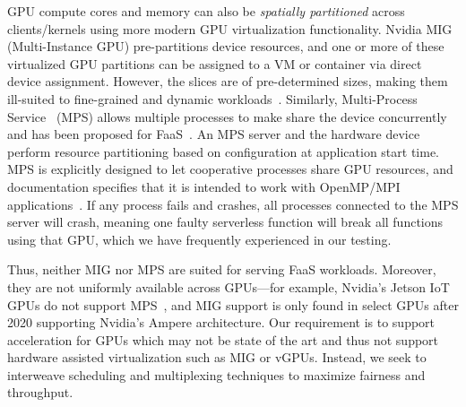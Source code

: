 GPU compute cores and memory can also be \emph{spatially partitioned} across clients/kernels using more modern GPU virtualization functionality. 
Nvidia MIG~\cite{nvidia-mig} (Multi-Instance GPU) pre-partitions device resources, and one or more of these virtualized GPU partitions can be assigned to a VM or container via direct device assignment.
However, the slices are of pre-determined sizes, making them ill-suited to fine-grained and dynamic workloads~\cite{li2022miso}. 
Similarly, Multi-Process Service~\cite{nvidia-mps} (MPS) allows multiple processes to make share the device concurrently and has been proposed for FaaS~\cite{gu2023fast}.
An MPS server and the hardware device perform resource partitioning based on configuration at application start time.
MPS is explicitly designed to let cooperative processes share GPU resources, and documentation specifies that it is intended to work with OpenMP/MPI applications~\cite{nvidia-mps}.
If any process fails and crashes, all processes connected to the MPS server will crash, meaning one faulty serverless function will break all functions using that GPU, which we have frequently experienced in our testing.

Thus, neither MIG nor MPS are suited for serving FaaS workloads.
Moreover, they are not uniformly available across GPUs---for example, Nvidia's Jetson IoT GPUs do not support MPS~\cite{jetson-no-mps}, and MIG support is only found in select GPUs after 2020 supporting Nvidia's Ampere architecture.
Our requirement is to support acceleration for GPUs which may not be state of the art and thus not support hardware assisted virtualization such as MIG or vGPUs.
Instead, we seek to interweave scheduling and multiplexing techniques to maximize fairness and throughput.






